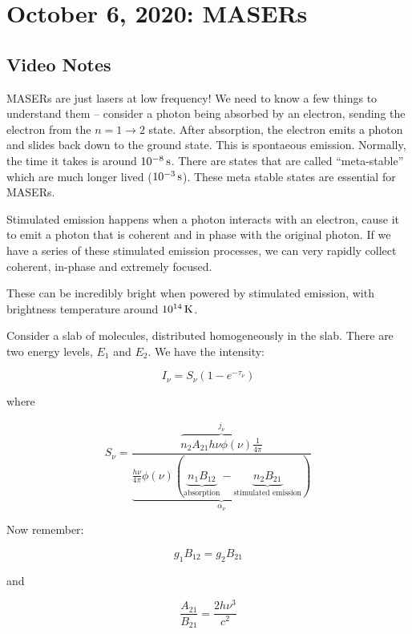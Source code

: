 \documentclass{article}
\newcommand{\unit}[1]{{\,\rm #1}}
\newcommand{\be}{\begin{equation}}
\newcommand{\ee}{\end{equation}}
\newcommand{\s}{\unit{s}}
\newcommand{\K}{\unit{K}}
\def\ato{{A_{21}}}
\def\bto{{B_{21}}}
\def\ato{{A_{21}}}
\def\bto{{B_{21}}}
\def\ato{{A_{21}}}
\def\bto{{B_{21}}}
\begin{document}
\newpage
\section{October 6, 2020: MASERs}

\subsection{Video Notes}

MASERs are just lasers at low frequency! We need to know a few things to understand them -- consider a photon being absorbed by an electron, sending the electron from the $n = 1 \rightarrow 2$ state. After absorption, the electron emits a photon and slides back down to the ground state. This is spontaeous emission. Normally, the time it takes is around $10^{-8} \s$. There are states that are called ``meta-stable'' which are much longer lived ($10^{-3} \s$). These meta stable states are essential for MASERs.

Stimulated emission happens when a photon interacts with an electron, cause it to emit a photon that is coherent and in phase with the original photon. If we have a series of these stimulated emission processes, we can very rapidly collect coherent, in-phase and extremely focused. 

These can be incredibly bright when powered by stimulated emission, with brightness temperature around $10^{14} \K$. 

Consider a slab of molecules, distributed homogeneously in the slab. There are two energy levels, $E_1$ and $E_2$. We have the intensity:

\be
I_\nu = S_\nu \left(1 - e^{-\tau_\nu}\right)
\ee

where 

\be
S_\nu = \frac{\overbrace{n_2 A_{21} h \nu \phi(\nu) \frac{1}{4\pi}}^{j_\nu} }{
\underbrace{
\frac{h \nu}{4 \pi} \phi(\nu)\left(\underbrace{n_1 B_{12}}_\text{absorption} - \underbrace{n_2 B_{21}}_\text{stimulated emission}\right)
}_{\alpha_\nu}
}
\ee

Now remember:

\be
g_1 B_{12} = g_2 B_{21} 
\ee

and 

\be
\frac{\ato}{\bto} = \frac{2 h \nu^3}{c^2}
\ee
\end{document}
